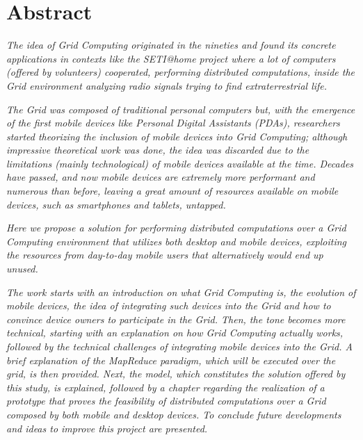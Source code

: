 \chapter*{Abstract}
\begin{spacing}{1.3}
\textit{\small
The idea of Grid Computing originated in the nineties and found its concrete applications in contexts like the SETI@home project where a lot of computers (offered by volunteers) cooperated, performing distributed computations, inside the Grid environment analyzing radio signals trying to find extraterrestrial life.
}\newline

\textit{\small
The Grid was composed of traditional personal computers but, with the emergence of the first mobile devices like Personal Digital Assistants (PDAs), researchers started theorizing the inclusion of mobile devices into Grid Computing; although impressive theoretical work was done, the idea was discarded due to the limitations (mainly technological) of mobile devices available at the time. Decades have passed, and now mobile devices are extremely more performant and numerous than before, leaving a great amount of resources available on mobile devices, such as smartphones and tablets, untapped.
}\newline

\textit{\small
Here we propose a solution for performing distributed computations over a Grid Computing environment that utilizes both desktop and mobile devices, exploiting the resources from day-to-day mobile users that alternatively would end up unused.
}\newline

\textit{\small
The work starts with an introduction on what Grid Computing is, the evolution of mobile devices, the idea of integrating such devices into the Grid and how to convince device owners to participate in the Grid. Then, the tone becomes more technical, starting with an explanation on how Grid Computing actually works, followed by the technical challenges of integrating mobile devices into the Grid. A brief explanation of the MapReduce paradigm, which will be executed over the grid, is then provided. Next, the model, which constitutes the solution offered by this study, is explained, followed by a chapter regarding the realization of a prototype that proves the feasibility of distributed computations over a Grid composed by both mobile and desktop devices. To conclude future developments and ideas to improve this project are presented.
}
\end{spacing}
